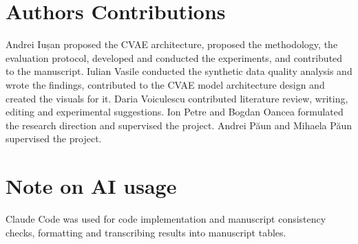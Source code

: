 \documentclass[12pt]{article}
\theoremstyle{paper}
\newif\ifdraft\drafttrue
\newcommand{\TODO}[1]{\ifdraft{\color{red}[TODO: #1]}\fi}
\begin{document}



\section*{Authors Contributions}
Andrei Iușan proposed the CVAE architecture, proposed the methodology, the evaluation protocol, developed and conducted the experiments, and contributed to the manuscript.
Iulian Vasile conducted the synthetic data quality analysis and wrote the findings, contributed to the CVAE model architecture design and created the visuals for it.
Daria Voiculescu contributed literature review, writing, editing and experimental suggestions.
Ion Petre and Bogdan Oancea formulated the research direction and supervised the project.
Andrei Păun and Mihaela Păun supervised the project.

\section*{Note on AI usage}
Claude Code was used for code implementation and manuscript consistency checks, formatting and transcribing results into manuscript tables.

\printbibliography

\newpage

\end{document}

